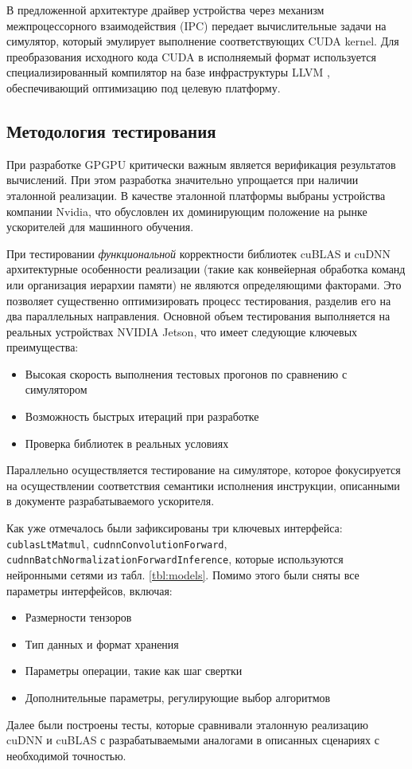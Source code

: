 В предложенной архитектуре драйвер устройства через механизм межпроцессорного взаимодействия (IPC) передает вычислительные задачи на
симулятор, который эмулирует выполнение соответствующих CUDA kernel. Для преобразования исходного кода CUDA в исполняемый формат
используется специализированный компилятор на базе инфраструктуры LLVM \cite{llvm_project_2025}, обеспечивающий оптимизацию под целевую платформу.

\subsection{Методология тестирования}
При разработке GPGPU критически важным является верификация результатов вычислений. При этом разработка значительно упрощается
при наличии эталонной реализации. В качестве эталонной платформы выбраны устройства компании Nvidia, что обусловлен их доминирующим
положение на рынке ускорителей для машинного обучения.

При тестировании \textit{функциональной} корректности библиотек cuBLAS и cuDNN архитектурные особенности реализации (такие как конвейерная
обработка команд или организация иерархии памяти) не являются определяющими факторами. Это позволяет существенно оптимизировать процесс
тестирования, разделив его на два параллельных направления. Основной объем тестирования выполняется на реальных устройствах NVIDIA Jetson,
что имеет следующие ключевых преимущества:
\begin{itemize}
    \item Высокая скорость выполнения тестовых прогонов по сравнению с симулятором
    \item Возможность быстрых итераций при разработке
    \item Проверка библиотек в реальных условиях
\end{itemize}
Параллельно осуществляется тестирование на симуляторе, которое фокусируется на осуществлении соответствия
семантики исполнения инструкции, описанными в документе разрабатываемого ускорителя.

Как уже отмечалось были зафиксированы три ключевых интерфейса: \texttt{cublasLtMatmul}, \texttt{cudnnConvolutionForward},
\texttt{cudnnBatchNormalizationForwardInference}, которые используются нейронными сетями из табл. \ref{tbl:models}. Помимо этого
были сняты все параметры интерфейсов, включая:
\begin{itemize}
    \item Размерности тензоров
    \item Тип данных и формат хранения
    \item Параметры операции, такие как шаг свертки
    \item Дополнительные параметры, регулирующие выбор алгоритмов
\end{itemize}
Далее были построены тесты, которые сравнивали эталонную реализацию cuDNN и cuBLAS с разрабатываемыми аналогами в описанных сценариях
с необходимой точностью.

